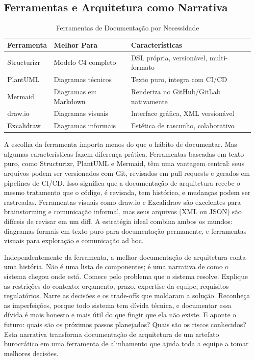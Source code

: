 \subsection{Ferramentas e Arquitetura como Narrativa}

\begin{table}[ht]
\centering
\caption{Ferramentas de Documentação por Necessidade}
\begin{tabular}{@{}p{3cm}p{4cm}p{6cm}@{}}
\toprule
\textbf{Ferramenta} & \textbf{Melhor Para} & \textbf{Características} \\
\midrule
Structurizr & Modelo C4 completo & DSL própria, versionável, multi-formato \\
PlantUML & Diagramas técnicos & Texto puro, integra com CI/CD \\
Mermaid & Diagramas em Markdown & Renderiza no GitHub/GitLab nativamente \\
draw.io & Diagramas visuais & Interface gráfica, XML versionável \\
Excalidraw & Diagramas informais & Estética de rascunho, colaborativo \\
\bottomrule
\end{tabular}
\end{table}

A escolha da ferramenta importa menos do que o hábito de documentar. Mas
algumas características fazem diferença prática. Ferramentas baseadas em
texto puro, como Structurizr, PlantUML e Mermaid, têm uma vantagem
central: seus arquivos podem ser versionados com Git, revisados em
pull requests e gerados em pipelines de CI/CD. Isso significa que a
documentação de arquitetura recebe o mesmo tratamento que o código,
é revisada, tem histórico, e mudanças podem ser rastreadas. Ferramentas
visuais como draw.io e Excalidraw são excelentes para brainstorming e
comunicação informal, mas seus arquivos (XML ou JSON) são difíceis de
revisar em um diff. A estratégia ideal combina ambos os mundos:
diagramas formais em texto puro para documentação permanente, e
ferramentas visuais para exploração e comunicação ad hoc.

Independentemente da ferramenta, a melhor documentação de arquitetura
conta uma história. Não é uma lista de componentes; é uma narrativa
de como o sistema chegou onde está. Comece pelo problema que o sistema
resolve. Explique as restrições do contexto: orçamento, prazo, expertise
da equipe, requisitos regulatórios. Narre as decisões e os trade-offs
que moldaram a solução. Reconheça as imperfeições, porque todo sistema tem
dívida técnica, e documentar essa dívida é mais honesto e mais útil do
que fingir que ela não existe. E aponte o futuro: quais são os próximos
passos planejados? Quais são os riscos conhecidos? Esta narrativa
transforma documentação de arquitetura de um artefato burocrático em uma
ferramenta de alinhamento que ajuda toda a equipe a tomar melhores
decisões.


